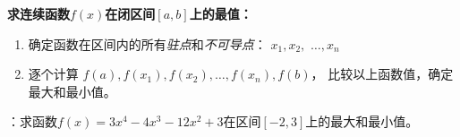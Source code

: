 \begin{center}
\end{center}

\begin{thx}
	{\bf 求连续函数$f(x)$在闭区间$[a,b]$上的最值：}
	\begin{enumerate}[(1)]
	  \item 确定函数在区间内的所有{\it 驻点}和{\it 不可导点}：
	  $x_1,x_2,$ $\ldots,x_n$ 
	  \item 逐个计算
	  $f(a),f(x_1),f(x_2),\ldots,f(x_n),f(b)$，
	  比较以上函数值，确定最大和最小值。
	\end{enumerate}
\end{thx}

{：}求函数$f(x)=3x^4-4x^3-12x^2+3$在区间$[-2,3]$上的最大和最小值。

